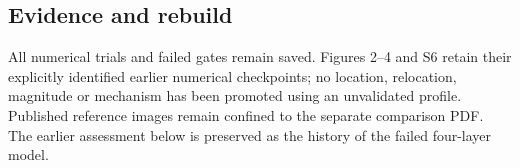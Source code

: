\subsection*{Evidence and rebuild}
\begingroup\footnotesize
{}\par
{}\par
{}\par
{}\par
{}\par
{}\par
{}\par
{}\par
{}\par
\endgroup
All numerical trials and failed gates remain saved. Figures 2--4 and S6 retain their explicitly identified earlier numerical checkpoints; no location, relocation, magnitude or mechanism has been promoted using an unvalidated profile. Published reference images remain confined to the separate comparison PDF. The earlier assessment below is preserved as the history of the failed four-layer model.
